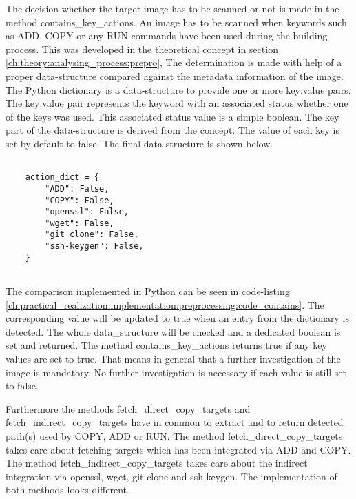 The decision whether the target image has to be scanned or not is made in the method contains\_key\_actions.
An image has to be scanned when keywords such as ADD, COPY or any RUN commands have been used during the building process. This was developed in the theoretical concept in section \ref{ch:theory:analysing_process:prepro}, 
The determination is made with help of a proper data-structure compared against the metadata information of the image.
The Python dictionary is a data-structure to provide one or more key:value pairs.
The key:value pair represents the keyword with an associated status whether one of the keys was used. This associated status value is a simple boolean.
The key part of the data-structure is derived from the concept. The value of each key is set by default to false. The final data-structure is shown below.
\lstset{language=Python}          %
\begin{lstlisting}[]  % Start your code-block
	
    action_dict = {
        "ADD": False,
        "COPY": False,
        "openssl": False,
        "wget": False,
        "git clone": False,
        "ssh-keygen": False,
    }
    
\end{lstlisting}
The comparison implemented in Python can be seen in code-listing \ref{ch:practical_realization:implementation:preprocessing:code_contains}. The corresponding value will be updated to true when an entry from the dictionary is detected. The whole data\_structure will be checked and a dedicated boolean is set and returned. The method contains\_key\_actions returns true if any key values are set to true. That means in general that a further investigation of the image is mandatory. No further investigation is necessary if each value is still set to false.

Furthermore the methods fetch\_direct\_copy\_targets and fetch\_indirect\_copy\_targets have in common to extract and to return detected path(s) used by COPY, ADD or RUN. The method fetch\_direct\_copy\_targets takes care about fetching targets which has been integrated via ADD and COPY. 
The method fetch\_indirect\_copy\_targets takes care about the indirect integration via openssl, wget, git clone and ssh-keygen. The implementation of both methods looks different.

